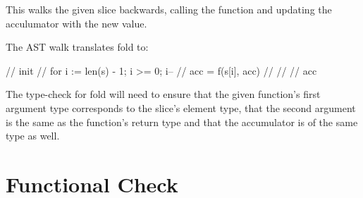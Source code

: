 This walks the given slice backwards, calling the function and updating the acculumator with
the new value.

The AST walk translates fold to:
\begin{code}
    \begin{gocode}
//   init {
//     for i := len(s) - 1; i >= 0; i-- {
//       acc = f(s[i], acc)
//     }
//   }
//   acc
    \end{gocode}
\end{code}

The type-check for fold will need to ensure that the given function's first argument type corresponds
to the slice's element type, that the second argument is the same as the function's return type and
that the accumulator is of the same type as well.

\section{Functional Check}
